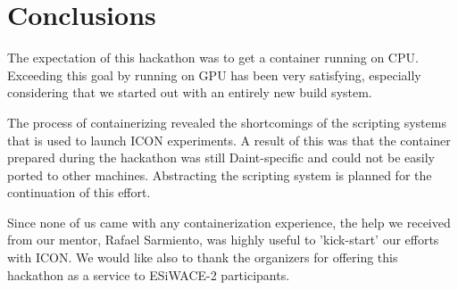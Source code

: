 \documentclass{article}
\begin{document}
\section{Conclusions}
The expectation of this hackathon was to get a container running on CPU. Exceeding this goal by running on GPU has been very satisfying, especially considering that we started out with an entirely new build system.

The process of containerizing revealed the shortcomings of the scripting systems that is used to launch ICON experiments. A result of this was that the container prepared during the hackathon was still Daint-specific and could not be easily ported to other machines. Abstracting the scripting system is planned for the continuation of this effort.

Since none of us came with any containerization experience, the help we received from our mentor, Rafael Sarmiento, was highly useful to 'kick-start' our efforts with ICON.   We would like also to thank the organizers for offering this hackathon as a service to ESiWACE-2 participants.
\end{document}
